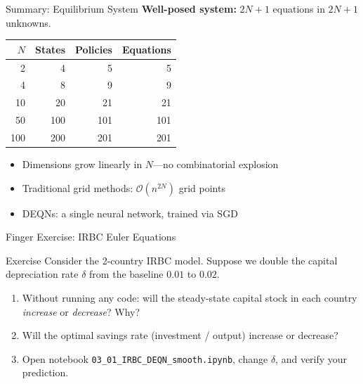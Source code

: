 \documentclass[aspectratio=169,11pt]{beamer}
\newcommand{\emphc}[1]{\textcolor{harvardcrimson}{#1}}
\begin{document}
\begin{frame}{Summary: Equilibrium System}
\textbf{Well-posed system:} $2N+1$ equations in $2N+1$ unknowns.

\vspace{0.5em}
\begin{center}
\begin{tabular}{rrrr}
\toprule
$N$ & \textbf{States} & \textbf{Policies} & \textbf{Equations} \\
\midrule
2 & 4 & 5 & 5 \\
4 & 8 & 9 & 9 \\
10 & 20 & 21 & 21 \\
50 & 100 & 101 & 101 \\
100 & 200 & 201 & 201 \\
\bottomrule
\end{tabular}
\end{center}

\vspace{0.3em}
\begin{itemize}
    \item Dimensions grow \emphc{linearly} in $N$---no combinatorial explosion
    \item Traditional grid methods: $\mathcal{O}(n^{2N})$ grid points
    \item DEQNs: a single neural network, trained via SGD
\end{itemize}
\end{frame}

\begin{frame}{\exercisepause{} Finger Exercise: IRBC Euler Equations}
\begin{exampleblock}{Exercise}
Consider the 2-country IRBC model. Suppose we \emphc{double} the capital depreciation rate $\delta$ from the baseline $0.01$ to $0.02$.
\begin{enumerate}
    \item Without running any code: will the steady-state capital stock in each country \emph{increase} or \emph{decrease}? Why?
    \item Will the optimal savings rate (investment / output) increase or decrease?
    \item Open notebook \texttt{03\_01\_IRBC\_DEQN\_smooth.ipynb}, change $\delta$, and verify your prediction.
\end{enumerate}
\end{exampleblock}
\end{frame}
\end{document}
